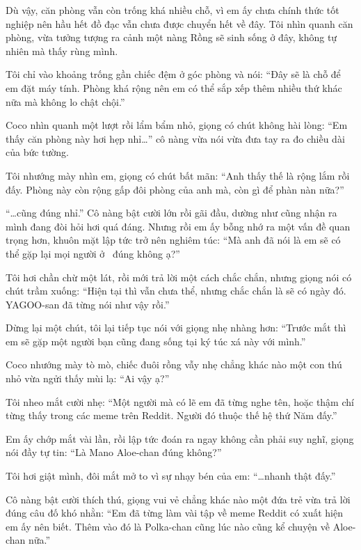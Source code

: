 \documentclass[../main.tex]{subfiles}
\begin{document}
Dù vậy, căn phòng vẫn còn trống khá nhiều chỗ, vì em ấy chưa chính thức tốt nghiệp nên hầu hết đồ đạc vẫn chưa được chuyển hết về đây. Tôi nhìn quanh căn phòng, vừa tưởng tượng ra cảnh một nàng Rồng sẽ sinh sống ở đây, không tự nhiên mà thấy rùng mình.

Tôi chỉ vào khoảng trống gần chiếc đệm ở góc phòng và nói: ``Đây sẽ là chỗ để em đặt máy tính. Phòng khá rộng nên em có thể sắp xếp thêm nhiều thứ khác nữa mà không lo chật chội.''

Coco nhìn quanh một lượt rồi lẩm bẩm nhỏ, giọng có chút không hài lòng: ``Em thấy căn phòng này hơi hẹp nhỉ\dots'' cô nàng vừa nói vừa đưa tay ra đo chiều dài của bức tường.

Tôi nhướng mày nhìn em, giọng có chút bất mãn: ``Anh thấy thế là rộng lắm rồi đấy. Phòng này còn rộng gấp đôi phòng của anh mà, còn gì để phàn nàn nữa?''

``\dots cũng đúng nhỉ.'' Cô nàng bật cười lớn rồi gãi đầu, dường như cũng nhận ra mình đang đòi hỏi hơi quá đáng. Nhưng rồi em ấy bỗng nhớ ra một vấn đề quan trọng hơn, khuôn mặt lập tức trở nên nghiêm túc: ``Mà anh đã nói là em sẽ có thể gặp lại mọi người ở \hll\ đúng không ạ?''

Tôi hơi chần chừ một lát, rồi mới trả lời một cách chắc chắn, nhưng giọng nói có chút trầm xuống: ``Hiện tại thì vẫn chưa thể, nhưng chắc chắn là sẽ có ngày đó. YAGOO-san đã từng nói như vậy rồi.''

Dừng lại một chút, tôi lại tiếp tục nói với giọng nhẹ nhàng hơn: ``Trước mắt thì em sẽ gặp một người bạn cũng đang sống tại ký túc xá này với mình.''

Coco nhướng mày tò mò, chiếc đuôi rồng vẫy nhẹ chẳng khác nào một con thú nhỏ vừa ngửi thấy mùi lạ: ``Ai vậy ạ?''

Tôi nheo mắt cười nhẹ: ``Một người mà có lẽ em đã từng nghe tên, hoặc thậm chí từng thấy trong các meme trên Reddit. Người đó thuộc thế hệ thứ Năm đấy.''

Em ấy chớp mắt vài lần, rồi lập tức đoán ra ngay không cần phải suy nghĩ, giọng nói đầy tự tin: ``Là Mano Aloe-chan đúng không?''

Tôi hơi giật mình, đôi mắt mở to vì sự nhạy bén của em: ``\dots nhanh thật đấy.''

Cô nàng bật cười thích thú, giọng vui vẻ chẳng khác nào một đứa trẻ vừa trả lời đúng câu đố khó nhằn: ``Em đã từng làm vài tập về meme Reddit có xuất hiện em ấy nên biết. Thêm vào đó là Polka-chan cũng lúc nào cũng kể chuyện về Aloe-chan nữa.''
\end{document}
